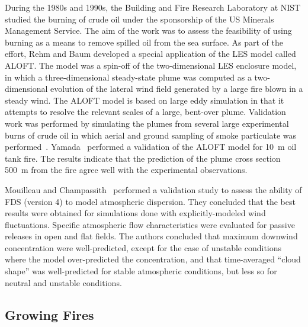 During the 1980s and 1990s,  the Building and Fire Research Laboratory at NIST studied the burning of  crude oil under the sponsorship of the US
Minerals Management Service.  The aim of the work was to assess the feasibility of using burning as a means to remove spilled oil from the sea
surface. As part of the  effort, Rehm and Baum developed a special application of the LES model called ALOFT. The model was a spin-off of the
two-dimensional LES enclosure  model, in which a three-dimensional steady-state plume was computed  as a two-dimensional evolution of the lateral
wind field  generated by a large fire blown  in a steady wind. The ALOFT model is based on  large eddy simulation in that it attempts to resolve the
relevant scales of a large, bent-over plume. Validation work  was  performed  by  simulating  the plumes  from  several  large experimental burns of
crude oil in which aerial and ground sampling of smoke       particulate       was       performed~\cite{McGrattan:4a}. Yamada~\cite{ALOFT:2}
performed  a validation  of the ALOFT  model for 10~m oil  tank fire. The results  indicate that the  prediction of the plume  cross  section  500~m
from   the  fire  agree  well  with  the experimental observations.

Mouilleau and Champassith~\cite{JLP:2009} performed a validation study to assess the ability of FDS (version 4) to
model atmospheric dispersion. They concluded that the best results were obtained for
simulations done with explicitly-modeled wind fluctuations.
Specific atmospheric flow characteristics were evaluated for passive releases in open
and flat fields. The authors concluded that maximum downwind concentration were well-predicted, except
for the case of unstable conditions where the model over-predicted
the concentration, and that time-averaged ``cloud shape'' was well-predicted for stable
atmospheric conditions, but less so for neutral and unstable conditions.



\subsection{Growing Fires}
\label{growingfires}

